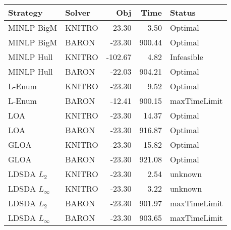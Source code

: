 \begin{tabular}{llrrl}
\toprule
Strategy & Solver & Obj & Time & Status \\
\midrule
MINLP BigM & KNITRO & -23.30 & 3.50 & Optimal \\
MINLP BigM & BARON & -23.30 & 900.44 & Optimal \\
MINLP Hull & KNITRO & -102.67 & 4.82 & Infeasible \\
MINLP Hull & BARON & -22.03 & 904.21 & Optimal \\
L-Enum & KNITRO & -23.30 & 9.52 & Optimal \\
L-Enum & BARON & -12.41 & 900.15 & maxTimeLimit \\
LOA & KNITRO & -23.30 & 14.37 & Optimal \\
LOA & BARON & -23.30 & 916.87 & Optimal \\
GLOA & KNITRO & -23.30 & 15.82 & Optimal \\
GLOA & BARON & -23.30 & 921.08 & Optimal \\
LDSDA $L_2$ & KNITRO & -23.30 & 2.54 & unknown \\
LDSDA $L_\infty$ & KNITRO & -23.30 & 3.22 & unknown \\
LDSDA $L_2$ & BARON & -23.30 & 901.97 & maxTimeLimit \\
LDSDA $L_\infty$ & BARON & -23.30 & 903.65 & maxTimeLimit \\
\bottomrule
\end{tabular}
